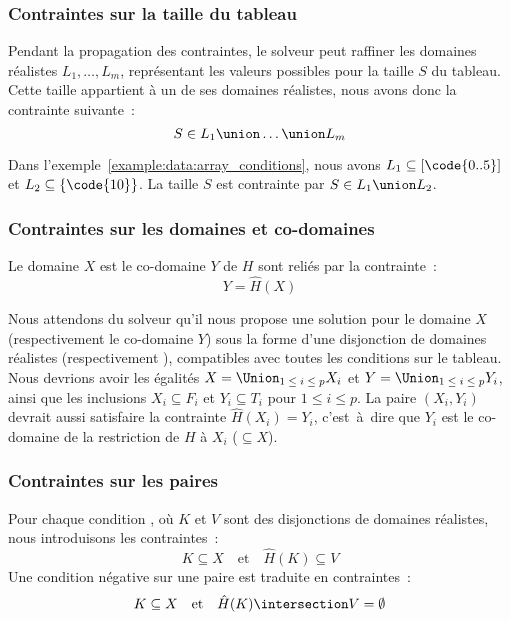 \subsubsection{Contraintes sur la taille du tableau}

Pendant la propagation des contraintes, le solveur peut raffiner les domaines
réalistes $L_1, \dots, L_m$, représentant les valeurs possibles pour la taille
$S$ du tableau. Cette taille appartient à un de ses domaines réalistes, nous
avons donc la contrainte suivante~:
%
$$S \in L_1 \union \dots \union L_m$$

Dans l'exemple~\ref{example:data:array_conditions}, nous avons $L_1 \subseteq
[\code{0..5}]$ et $L_2 \subseteq \{\code{10}\}$. La taille $S$ est contrainte
par $S \in L_1 \union L_2$.

\subsubsection{Contraintes sur les domaines et co-domaines}

Le domaine $X$ est le co-domaine $Y$ de $H$ sont reliés par la contrainte~:
%
$$Y = \hat{H}(X)$$

Nous attendons du solveur qu'il nous propose une solution pour le domaine $X$
(respectivement le co-domaine $Y$) sous la forme d'une disjonction de domaines
réalistes  (respectivement ), compatibles avec toutes les conditions sur le tableau. Nous
devrions avoir les égalités $X = \Union_{1 \;\leq\; i \;\leq\; p} X_i$ et $Y =
\Union_{1 \;\leq\; i \;\leq\; p} Y_i$, ainsi que les inclusions $X_i \subseteq
F_i$ et $Y_i \subseteq T_i$ pour $1 \leq i \leq p$. La paire $(X_i, Y_i)$
devrait aussi satisfaire la contrainte $\hat{H}(X_i) = Y_i$, c'est~à~dire que
$Y_i$ est le co-domaine de la restriction de $H$ à $X_i$ ($\subseteq X$).

\subsubsection{Contraintes sur les paires}

Pour chaque condition , où $K$ et $V$ sont des disjonctions de
domaines réalistes, nous introduisons les contraintes~:
%
$$K \subseteq X \quad\mathrm{et}\quad \hat{H}(K) \subseteq V$$
%
Une condition négative sur une paire  est traduite en
contraintes~:
%
$$K \subseteq X \quad\mathrm{et}\quad \hat{H}(K) \intersection V = \emptyset$$

